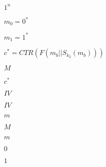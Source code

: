 \documentclass[10pt]{book}
\begin{document}
\begin{mdSnippets}
\begin{mdInlineSnippet}%
$1^n$\end{mdInlineSnippet}%
\begin{mdInlineSnippet}[1e2870f5046089aaa15b68a399c064b5]%
$m_0 = 0^*$\end{mdInlineSnippet}%
\begin{mdInlineSnippet}[13c1ceaed82e8d7e17e01bb9b57c82e9]%
$m_1 = 1^*$\end{mdInlineSnippet}%
\begin{mdInlineSnippet}[ee0e5021dd01a44df8a2305f02b2fbb6]%
$c^* = CTR(F(m_b || S_{k_2}(m_b)))$\end{mdInlineSnippet}%
\begin{mdInlineSnippet}[69691c7bdcc3ce6d5d8a1361f22d04ac]%
$M$\end{mdInlineSnippet}%
\begin{mdInlineSnippet}%
$c^*$\end{mdInlineSnippet}%
\begin{mdInlineSnippet}[cf482c5807b62034beeabdb795c5a689]%
$IV$\end{mdInlineSnippet}%
\begin{mdInlineSnippet}[cf482c5807b62034beeabdb795c5a689]%
$IV$\end{mdInlineSnippet}%
\begin{mdInlineSnippet}[6f8f57715090da2632453988d9a1501b]%
$m$\end{mdInlineSnippet}%
\begin{mdInlineSnippet}[69691c7bdcc3ce6d5d8a1361f22d04ac]%
$M$\end{mdInlineSnippet}%
\begin{mdInlineSnippet}[6f8f57715090da2632453988d9a1501b]%
$m$\end{mdInlineSnippet}%
\begin{mdInlineSnippet}%
$0$\end{mdInlineSnippet}%
\begin{mdInlineSnippet}[c4ca4238a0b923820dcc509a6f75849b]%
$1$\end{mdInlineSnippet}%
\begin{mdInlineSnippet}%

\end{mdInlineSnippet}
\end{mdSnippets}
\end{document}
